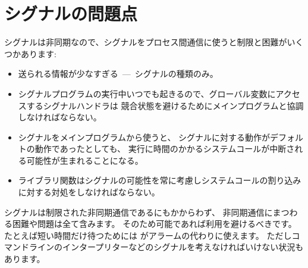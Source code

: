 \section{シグナルの問題点}

シグナルは非同期なので、シグナルをプロセス間通信に使うと制限と困難がいくつかあります:
%
\begin{itemize}

\item 送られる情報が少なすぎる~---~シグナルの種類のみ。

\item シグナルプログラムの実行中いつでも起きるので、グローバル変数にアクセスするシグナルハンドラは
  競合状態を避けるためにメインプログラムと協調しなければならない。

\item シグナルをメインプログラムから使うと、
  シグナルに対する動作がデフォルトの動作であったとしても、
  実行に時間のかかるシステムコールが中断される可能性が生まれることになる。

\item ライブラリ関数はシグナルの可能性を常に考慮しシステムコールの割り込みに対する対処をしなければならない。

\end{itemize}
%

シグナルは制限された非同期通信であるにもかからわず、
非同期通信にまつわる困難や問題は全て含みます。
そのため可能であれば利用を避けるべきです。
たとえば短い時間だけ待つためには  がアラームの代わりに使えます。
ただしコマンドラインのインタープリターなどのシグナルを考えなければいけない状況もあります。

